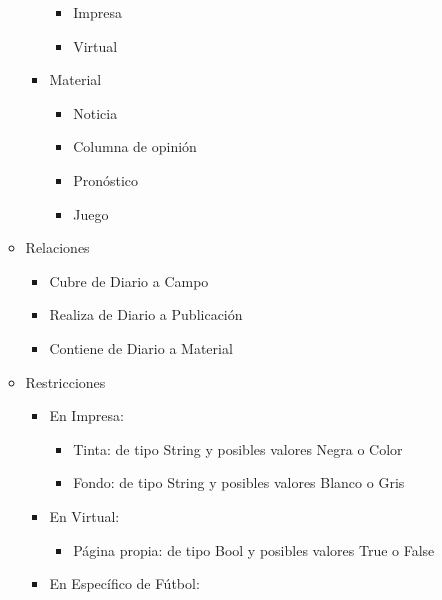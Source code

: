 \documentclass[11pt]{article}
\begin{document}
\begin{enumerate}[I. ]
\begin{itemize}
\begin{itemize}
                              \begin{itemize}
                                    \item Impresa
                                    \item Virtual
                              \end{itemize}
                        \item Material
                              \begin{itemize}
                                    \item Noticia
                                    \item Columna de opinión
                                    \item Pronóstico
                                    \item Juego
                              \end{itemize}
                  \end{itemize}
            \item Relaciones
                  \begin{itemize}
                        \item Cubre de Diario a Campo
                        \item Realiza de Diario a Publicación
                        \item Contiene de Diario a Material
                  \end{itemize}
            \item Restricciones
                  \begin{itemize}
                  \item En Impresa:
                  \begin{itemize}
                        \item Tinta: de tipo String y posibles valores Negra o Color
                        \item Fondo: de tipo String y posibles valores Blanco o Gris
                  \end{itemize}
                  \item En Virtual:
                  \begin{itemize}
                        \item Página propia: de tipo Bool y posibles valores True o False
                  \end{itemize}
                  \item En Específico de Fútbol:

\end{itemize}
\end{itemize}
\end{enumerate}
\end{document}

